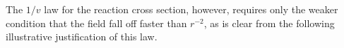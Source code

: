 The $1/v$ law for the reaction cross section, however, requires only the weaker condition that the field fall off faster than $r^{-2}$, as is clear from the following illustrative justification of this law.
